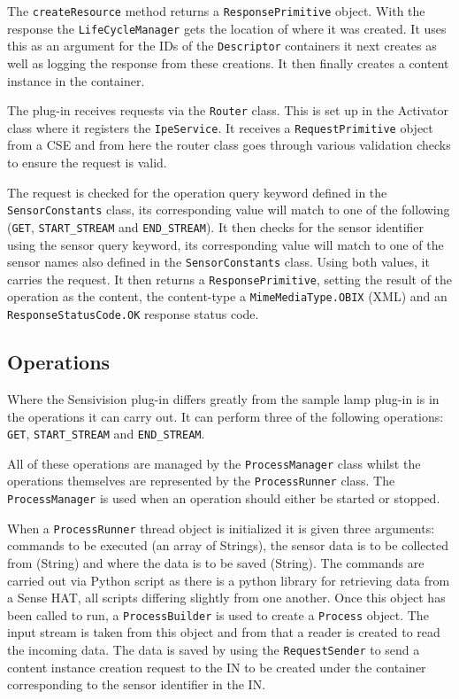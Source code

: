 The \lstinline{createResource} method returns a \lstinline{ResponsePrimitive} object. With the response the \lstinline{LifeCycleManager} gets the location of where it was created. It uses this as an argument for the IDs of the \lstinline{Descriptor} containers it next creates as well as logging the response from these creations. It then finally creates a content instance in the container. 

The plug-in receives requests via the \lstinline{Router} class. This is set up in the Activator class where it registers the \lstinline{IpeService}. It receives a \lstinline{RequestPrimitive} object from a CSE and from here the router class goes through various validation checks to ensure the request is valid. 

The request is checked for the operation query keyword defined in the \lstinline{SensorConstants} class, its corresponding value will match to one of the following (\lstinline{GET}, \lstinline{START_STREAM} and \lstinline{END_STREAM}). It then checks for the sensor identifier using the sensor query keyword, its corresponding value will match to one of the sensor names also defined in the \lstinline{SensorConstants} class. Using both values, it carries the request. It then returns a \lstinline{ResponsePrimitive}, setting the result of the operation as the content, the content-type a \lstinline{MimeMediaType.OBIX} (XML) and an \lstinline{ResponseStatusCode.OK} response status code.

\subsection{Operations}

Where the Sensivision plug-in differs greatly from the sample lamp plug-in is in the operations it can carry out. It can perform three of the following operations: \lstinline{GET}, \lstinline{START_STREAM} and \lstinline{END_STREAM}. 

All of these operations are managed by the \lstinline{ProcessManager} class whilst the operations themselves are represented by the \lstinline{ProcessRunner} class. The \lstinline{ProcessManager} is used when an operation should either be started or stopped. 

When a \lstinline{ProcessRunner} thread object is initialized it is given three arguments: commands to be executed (an array of Strings), the sensor data is to be collected from (String) and where the data is to be saved (String). The commands are carried out via Python script as there is a python library for retrieving data from a Sense HAT, all scripts differing slightly from one another. Once this object has been called to run, a \lstinline{ProcessBuilder} is used to create a \lstinline{Process} object. The input stream is taken from this object and from that a reader is created to read the incoming data. The data is saved by using the \lstinline{RequestSender} to send a content instance creation request to the IN to be created under the container corresponding to the sensor identifier in the IN.

